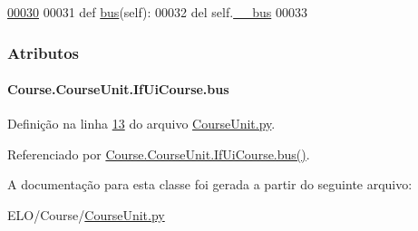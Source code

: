 \begin{DoxyCode}
\hypertarget{classCourse_1_1CourseUnit_1_1IfUiCourse_l00030}{}\hyperlink{classCourse_1_1CourseUnit_1_1IfUiCourse_a6d3c42a9777fe9dd395d9390aef47903}{00030} 
00031     \textcolor{keyword}{def }\hyperlink{classCourse_1_1CourseUnit_1_1IfUiCourse_a228fc709b99da3a7e6f5020bd07cee03}{bus}(self):
00032         del self.\hyperlink{classCourse_1_1CourseUnit_1_1IfUiCourse_aa961f0720b3e194f935a29f6cd0bbbd5}{\_\_bus}
00033 

\end{DoxyCode}


\subsubsection{Atributos}
\hypertarget{classCourse_1_1CourseUnit_1_1IfUiCourse_a228fc709b99da3a7e6f5020bd07cee03}{
\paragraph[{bus}]{\setlength{\rightskip}{0pt plus 5cm}Course.\-Course\-Unit.\-If\-Ui\-Course.\-bus}}\label{classCourse_1_1CourseUnit_1_1IfUiCourse_a228fc709b99da3a7e6f5020bd07cee03}


Definição na linha \hyperlink{CourseUnit_8py_source_l00013}{13} do arquivo \hyperlink{CourseUnit_8py_source}{Course\-Unit.\-py}.



Referenciado por \hyperlink{classCourse_1_1CourseUnit_1_1IfUiCourse_a6d3c42a9777fe9dd395d9390aef47903}{Course.\-Course\-Unit.\-If\-Ui\-Course.\-bus()}.



A documentação para esta classe foi gerada a partir do seguinte arquivo\-:\begin{DoxyCompactItemize}
\item 
E\-L\-O/\-Course/\hyperlink{CourseUnit_8py}{Course\-Unit.\-py}\end{DoxyCompactItemize}
